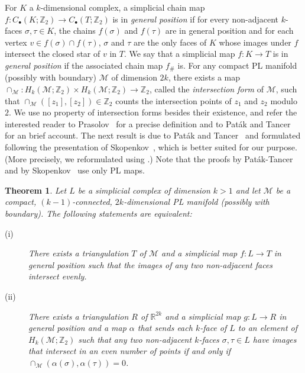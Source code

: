 \documentclass[11pt]{article}
\newcommand{\R}{\mathbb{R}}
\newcommand{\Z}{\mathbb{Z}}
\newcommand{\M}{\mathcal{M}}
\newcommand{\defn}[1]{\emph{\color{violet}#1}}
\newtheorem{theorem}{Theorem}
\begin{document}
%
\medskip
%
For $K$ a $k$-dimensional complex, a simplicial chain map $f:C_\bullet(K;\Z_2) \to C_\bullet(T;\Z_2)$ is in \defn{general position} if for every non-adjacent $k$-faces $\sigma, \tau \in K$, the chains $f(\sigma)$ and $f(\tau)$ are in general position and for each vertex $v \in f(\sigma) \cap f(\tau)$, $\sigma$ and $\tau$ are the only faces of $K$ whose images under $f$ intersect the closed star of $v$ in $T$. We say that a simplicial map $f:K \to T$ is  in \defn{general position} if the associated chain map $f_\#$ is.
%
\medskip
%
For any compact PL manifold (possibly with boundary) $\M$ of dimension $2k$, there exists a map $\cap_{\M}:H_k(\M;\Z_2)\times H_k(\M;\Z_2)\to\Z_2$, called the \defn{intersection form} of $\M$, such that $\cap_{\M}([z_1],[z_2])\in\Z_2$ counts the intersection points of $z_1$ and $z_2$ modulo $2$. We use no property of intersection forms besides their existence, and refer the interested reader to Prasolov~\cite[Chapter~2, $\S$2.7]{prasolov2007elements} for a precise definition and to Paták and Tancer~\cite{patak-tancer} for an brief account.
%
%
\medskip
%
The next result is due to Paták and Tancer~\cite[Proposition~21]{patak-tancer} and formulated following the presentation of Skopenkov~\cite{skopenkov}, which is better suited for our purpose. (More precisely, we reformulated \cite[Theorem~1.1.5]{skopenkov} using \cite[Lemma~2.1.1]{skopenkov}.) Note that the proofs by Paták-Tancer~\cite{patak-tancer} and by Skopenkov~\cite{skopenkov} use only PL maps.
%
\begin{theorem}
  \label{th:skopenkov}
  Let $L$ be a simplicial complex of dimension $k>1$ and let $\M$ be a compact, $(k-1)$-connected, $2k$-dimensional PL manifold (possibly with boundary). The following statements are equivalent:
%
  \begin{description}
  \item[(i)] There exists a triangulation $T$ of $\M$ and a simplicial map  $f:L \to T$ in general position such that the images of any two non-adjacent faces intersect evenly.\medskip
%
  \item[(ii)] There exists a triangulation $R$ of $\R^{2k}$ and a simplicial map $g: L \to R$ in general position and a map $\alpha$ that sends each $k$-face of $L$ to an element of $H_k(\M;\Z_2)$ such that any two non-adjacent $k$-faces $\sigma,\tau \in L$ have images that intersect in an even number of points if and only if $\cap_{\M}(\alpha(\sigma),\alpha(\tau)) = 0$.
  \end{description}
\end{theorem}
%
%
\end{document}
